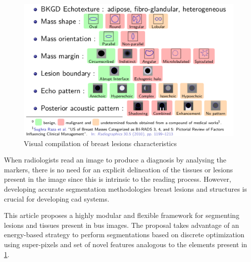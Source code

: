 \begin{figure}[htpb]
  \centering
  \includegraphics[width=0.9\linewidth]{doc}
  \caption{Visual compilation of breast lesions characteristics}
  \label{fig:lesions}
\end{figure}

When radiologists read an image to produce a diagnosis by analysing the markers, there is no need for an explicit delineation of the tissues or lesions present in the image since this is intrinsic to the reading process.
However, developing accurate segmentation methodologies breast lesions and structures is crucial for developing \ac{cad} systems.

%

This article proposes a highly modular and flexible framework for segmenting lesions and tissues present in \ac{bus} images.
The proposal takes advantage of an energy-based strategy to perform segmentations based on discrete optimization using super-pixels and set of novel features analogous to the elements present in \cref{fig:lesions}.

